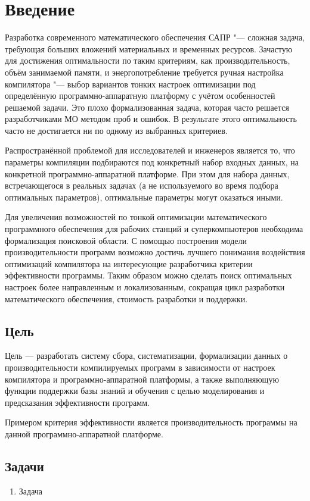 \section{Введение}
Разработка современного математического обеспечения САПР "--- сложная задача, требующая больших вложений материальных и временных ресурсов. Зачастую для достижения оптимальности по таким критериям, как производительность, объём занимаемой памяти, и энергопотребление требуется ручная настройка компилятора "--- выбор вариантов тонких настроек оптимизации под определённую программно-аппаратную платформу с учётом особенностей решаемой задачи. Это плохо формализованная задача, которая часто решается разработчиками МО методом проб и ошибок. В результате этого оптимальность часто не достигается ни по одному из выбранных критериев.

Распространённой проблемой для исследователей и инженеров является то, что параметры компиляции подбираются под конкретный набор входных данных, на конкретной программно-аппаратной платформе. При этом для набора данных, встречающегося в реальных задачах (а не используемого во время подбора оптимальных параметров), оптимальные параметры могут оказаться иными.

Для увеличения возможностей по тонкой оптимизации математического программного обеспечения для рабочих станций и суперкомпьютеров необходима формализация поисковой области. С помощью построения модели производительности программ возможно достичь лучшего понимания воздействия оптимизаций компилятора на интересующие разработчика критерии эффективности программы. Таким образом можно сделать поиск оптимальных настроек более направленным и локализованным, сокращая цикл разработки математического обеспечения, стоимость разработки и поддержки.


\subsection{Цель}
Цель — разработать систему сбора, систематизации, формализации данных о производительности компилируемых программ в зависимости от настроек компилятора и программно-аппаратной платформы, а также выполняющую функции поддержки базы знаний и обучения с целью моделирования и предсказания эффективности программ.

Примером критерия эффективности является производительность программы на данной программно-аппаратной платформе.


\subsection{Задачи}
\begin{enumerate}
\item Задача
\end{enumerate}


